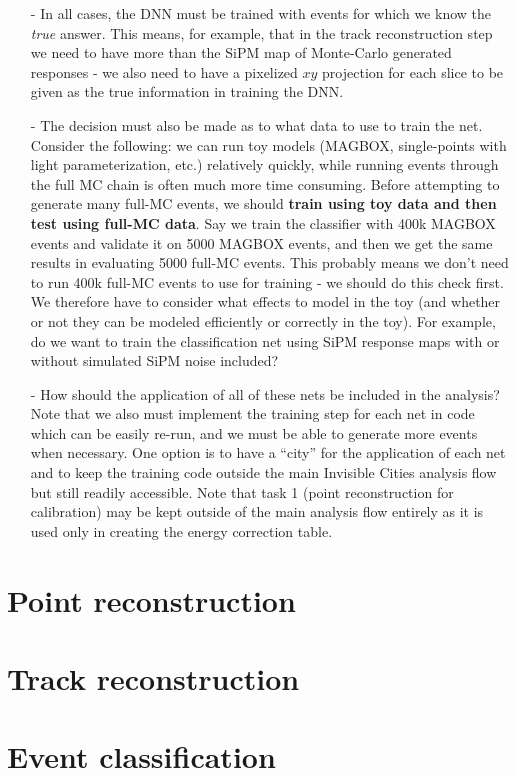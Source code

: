 \documentclass[a4paper,11pt]{article}
\begin{document}
\begin{enumerate}
	\item[-] In all cases, the DNN must be trained with events for which we know the \emph{true} answer.  This means, for example, that in the track reconstruction step we need to have more than the SiPM map of Monte-Carlo generated responses - we also need to have a pixelized $xy$ projection for each slice to be given as the true information in training the DNN.  
	\item[-] The decision must also be made as to what data to use to train the net.  Consider the following: we can run toy models (MAGBOX, single-points with light parameterization, etc.) relatively quickly, while running events through the full MC chain is often much more time consuming.  Before attempting to generate many full-MC events, we should \textbf{train using toy data and then test using full-MC data}.  Say we train the classifier with 400k MAGBOX events and validate it on 5000 MAGBOX events, and then we get the same results in evaluating 5000 full-MC events.  This probably means we don't need to run 400k full-MC events to use for training - we should do this check first.  We therefore have to consider what effects to model in the toy (and whether or not they can be modeled efficiently or correctly in the toy).  For example, do we want to train the classification net using SiPM response maps with or without simulated SiPM noise included?  
	\item[-] How should the application of all of these nets be included in the analysis?  Note that we also must implement the training step for each net in code which can be easily re-run, and we must be able to generate more events when necessary.  One option is to have a ``city'' for the application of each net and to keep the training code outside the main Invisible Cities analysis flow but still readily accessible.  Note that task 1 (point reconstruction for calibration) may be kept outside of the main analysis flow entirely as it is used only in creating the energy correction table.
\end{enumerate}

\section{Point reconstruction}\label{sec:ptreconstruction}


\section{Track reconstruction}\label{sec:trkreconstruction}


\section{Event classification}\label{sec:evtclassification}


%
\end{document}
